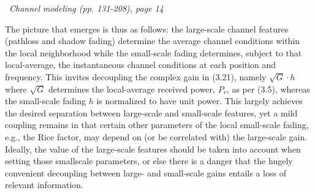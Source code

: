 \documentclass[a4paper, 12pt]{book}
\begin{document}
\begin{yellowbox}
\faBook\ \textit{Channel modeling (pp. 131-208), page 14}

The picture that emerges is thus as follows: the large-scale channel features (pathloss and shadow fading) determine the average channel conditions within the local neighborhood while the small-scale fading determines, subject to that local-average, the instantaneous channel conditions at each position and frequency. This invites decoupling the complex gain in (3.21), namely $\sqrt{G} \cdot h$ where $\sqrt{G}$ determines the local-average received power, $P_r$, as per (3.5), whereas the small-scale fading $h$ is normalized to have unit power. This largely achieves the desired separation between large-scale and small-scale features, yet a mild coupling remains in that certain other parameters of the local small-scale fading, e.g., the Rice factor, may depend on (or be correlated with) the large-scale gain. Ideally, the value of the large-scale features should be taken into account when setting those smallscale parameters, or else there is a danger that the hugely convenient decoupling between large- and small-scale gains entails a loss of relevant information.
\end{yellowbox}

\begin{center}
\end{center}
\end{document}
